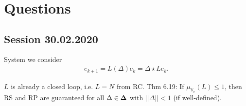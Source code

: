 \chapter{Questions} 

\section{Session 30.02.2020}
System we consider 
\begin{align}
e_{k+1} = L(\Delta)e_k = \Delta \star L e_k.
\end{align}

$L$ is already a closed loop, i.e. $L = N$ from RC. 
Thm 6.19: If $\mu_{\mathbb{V}_e}(L) \leq 1 $, then RS and RP are guaranteed for all $\Delta \in \mathbf{\Delta}$ with $||\Delta|| < 1$ (if well-defined). 

%
%
%
